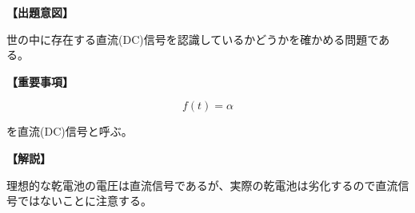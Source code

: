 \noindent \textbf{【出題意図】}

\noindent 世の中に存在する直流(DC)信号を認識しているかどうかを確かめる問題である。

\vspace{1em}
\noindent \textbf{【重要事項】}

\[
f(t) = \alpha
\]

\medskip
\noindent を直流(DC)信号と呼ぶ。


\vspace{1em}
\noindent \textbf{【解説】}

\noindent 理想的な乾電池の電圧は直流信号であるが、実際の乾電池は劣化するので直流信号ではないことに注意する。
